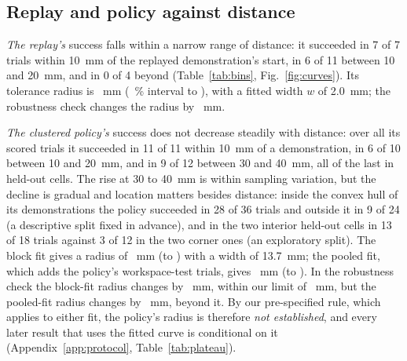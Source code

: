 \subsection{Replay and policy against distance}
\emph{The replay's} success falls within a narrow range of distance: it succeeded in 7 of 7 trials within 10~mm of the replayed demonstration's start, in 6 of 11 between 10 and 20~mm, and in 0 of 4 beyond (Table~\ref{tab:bins}, Fig.~\ref{fig:curves}). %
Its tolerance radius is \radiusReplay~mm (\intervalLevel~\% interval \radiusReplayLow to \radiusReplayHigh), with a fitted width $w$ of 2.0~mm; the robustness check changes the radius by \plateauShiftReplay~mm. %

\emph{The clustered policy's} success does not decrease steadily with distance: over all its scored trials it succeeded in 11 of 11 within 10~mm of a demonstration, in 6 of 10 between 10 and 20~mm, and in 9 of 12 between 30 and 40~mm, all of the last in held-out cells. %
The rise at 30 to 40~mm is within sampling variation, but the decline is gradual and location matters besides distance: inside the convex hull of its demonstrations the policy succeeded in 28 of 36 trials and outside it in 9 of 24 (a descriptive split fixed in advance), and in the two interior held-out cells in 13 of 18 trials against 3 of 12 in the two corner ones (an exploratory split). %
The block fit gives a radius of \radiusClusteredThreshold~mm (\radiusClusteredThresholdLow to \radiusClusteredThresholdHigh) with a width of 13.7~mm; the pooled fit, which adds the policy's workspace-test trials, gives \radiusClustered~mm (\radiusClusteredLow to \radiusClusteredHigh). %
In the robustness check the block-fit radius changes by \plateauShiftClusteredThreshold~mm, within our limit of \plateauShiftLimit~mm, but the pooled-fit radius changes by \plateauShiftClustered~mm, beyond it. By our pre-specified rule, which applies to either fit, the policy's radius is therefore \emph{not established}, and every later result that uses the fitted curve is conditional on it (Appendix~\ref{app:protocol}, Table~\ref{tab:plateau}).

